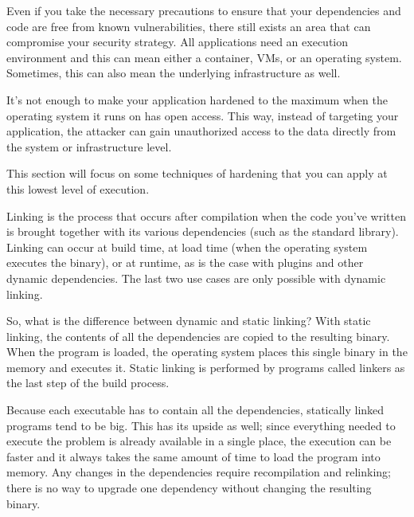 
Even if you take the necessary precautions to ensure that your dependencies and code are free from known vulnerabilities, there still exists an area that can compromise your security strategy. All applications need an execution environment and this can mean either a container, VMs, or an operating system. Sometimes, this can also mean the underlying infrastructure as well.

It's not enough to make your application hardened to the maximum when the operating system it runs on has open access. This way, instead of targeting your application, the attacker can gain unauthorized access to the data directly from the system or infrastructure level.

This section will focus on some techniques of hardening that you can apply at this lowest level of execution.


Linking is the process that occurs after compilation when the code you've written is brought together with its various dependencies (such as the standard library). Linking can occur at build time, at load time (when the operating system executes the binary), or at runtime, as is the case with plugins and other dynamic dependencies. The last two use cases are only possible with dynamic linking.

So, what is the difference between dynamic and static linking? With static linking, the contents of all the dependencies are copied to the resulting binary. When the program is loaded, the operating system places this single binary in the memory and executes it. Static linking is performed by programs called linkers as the last step of the build process.

Because each executable has to contain all the dependencies, statically linked programs tend to be big. This has its upside as well; since everything needed to execute the problem is already available in a single place, the execution can be faster and it always takes the same amount of time to load the program into memory. Any changes in the dependencies require recompilation and relinking; there is no way to upgrade one dependency without changing the resulting binary.


